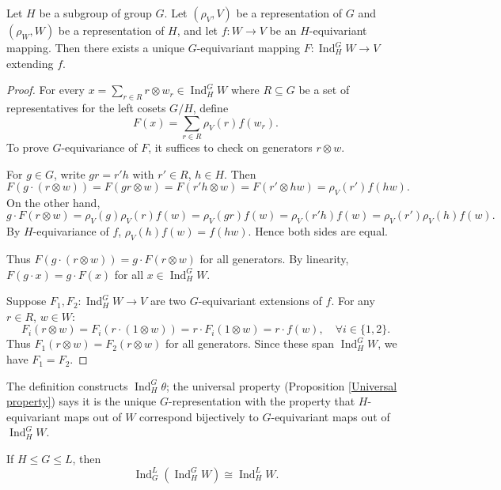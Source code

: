 \begin{prop}
\label{Universal property}
Let \(H\) be a subgroup of group $G$. Let \((\rho_V, V)\) be a representation of \(G\) and \((\rho_W, W)\) be a representation of \(H\), and let \(f: W \to V\) be an \(H\)-equivariant mapping. Then there exists a unique \(G\)-equivariant mapping \(F: \operatorname{Ind}_H^G W \to V\) extending \(f\).
\end{prop}

\begin{proof}
For every \(x = \sum_{r\in R} r\otimes w_r\in \operatorname{Ind}_H^G W\) where \(R \subseteq G\) be a set of representatives for the left cosets \(G/H\), define \[F(x) = \sum_{r\in R} \rho_V(r) f(w_r).\]
To prove \(G\)-equivariance of \(F\), it suffices to check on generators \(r \otimes w\).

For \(g \in G\), write \(gr = r' h\) with \(r' \in R\), \(h \in H\). Then 
\[
F(g \cdot (r \otimes w)) = F(gr \otimes w) = F(r' h \otimes w) = F(r' \otimes h w) = \rho_V(r') f(h w).
\]
On the other hand,
\[
g \cdot F(r \otimes w) = \rho_V(g) \rho_V(r) f(w) = \rho_V(gr) f(w) = \rho_V(r' h) f(w) = \rho_V(r') \rho_V(h) f(w).
\]
By \(H\)-equivariance of \(f\), \(\rho_V(h) f(w) = f(h w)\). Hence both sides are equal.

Thus \(F(g \cdot (r \otimes w)) = g \cdot F(r \otimes w)\) for all generators. By linearity, \(F(g \cdot x) = g \cdot F(x)\) for all \(x \in \operatorname{Ind}_H^G W\).

Suppose \(F_1, F_2: \operatorname{Ind}_H^G W \to V\) are two \(G\)-equivariant extensions of \(f\). For any \(r \in R\), \(w \in W\):
\[
F_i(r \otimes w) = F_i(r \cdot (1 \otimes w)) = r \cdot F_i(1 \otimes w) = r \cdot f(w), \quad \forall i \in \{1, 2\}.
\]
Thus \(F_1(r \otimes w) = F_2(r \otimes w)\) for all generators. Since these span \(\operatorname{Ind}_H^G W\), we have \(F_1 = F_2\).
\end{proof}

\begin{remark}
The definition constructs \(\operatorname{Ind}_H^G \theta\); the universal property (Proposition \ref{Universal property}) says it is the unique \(G\)-representation 
with the property that \(H\)-equivariant maps out of \(W\) correspond bijectively to \(G\)-equivariant maps out of \(\operatorname{Ind}_H^G W\).
\end{remark}

\begin{prop}[Transitivity]
If \(H \le G \le L\), then
\[
\operatorname{Ind}_G^L (\operatorname{Ind}_H^G W) \cong \operatorname{Ind}_H^L W.
\]
\end{prop}

